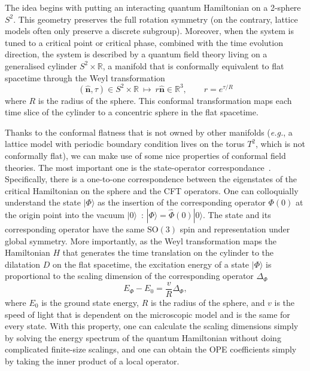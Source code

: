 \documentclass{timesjhep}
\begin{document}
The idea begins with putting an interacting quantum Hamiltonian on a 2-sphere $S^2$. This geometry preserves the full rotation symmetry (on the contrary, lattice models often only preserve a discrete subgroup). Moreover, when the system is tuned to a critical point or critical phase, combined with the time evolution direction, the system is described by a quantum field theory living on a generalised cylinder $S^2\times\mathbb{R}$, a manifold that is conformally equivalent to flat spacetime through the Weyl transformation
\begin{equation}
    (\hat{\mathbf{n}},\tau)\in S^2\times\mathbb{R}\ \longmapsto\ r\hat{\mathbf{n}}\in\mathbb{R}^3,\qquad r=e^{\tau/R}
\end{equation}
where $R$ is the radius of the sphere. This conformal transformation maps each time slice of the cylinder to a concentric sphere in the flat spacetime.

Thanks to the conformal flatness that is not owned by other manifolds (\textit{e.g.}, a lattice model with periodic boundary condition lives on the torus $T^2$, which is not conformally flat), we can make use of some nice properties of conformal field theories. The most important one is the state-operator correspondance~\cite{Pappadopulo2012Radial,Rychkov2016CFT,SimmonsDuffin2016CFT}. Specifically, there is a one-to-one correspondence between the eigenstates of the critical Hamiltonian on the sphere and the CFT operators. One can colloquially understand the state $|\Phi\rangle$ as the insertion of the corresponding operator $\Phi(0)$ at the origin point into the vacuum $|0\rangle$~: $|\Phi\rangle=\hat{\Phi}(0)|0\rangle$. The state and its corresponding operator have the same $\mathrm{SO}(3)$ spin and representation under global symmetry. More importantly, as the Weyl transformation maps the Hamiltonian $H$ that generates the time translation on the cylinder to the dilatation $D$ on the flat spacetime, the excitation energy of a state $|\Phi\rangle$ is proportional to the scaling dimension of the corresponding operator $\Delta_\Phi$
\begin{equation}
    E_\Phi-E_0=\frac{v}{R}\Delta_\Phi,
\end{equation}
where $E_0$ is the ground state energy, $R$ is the radius of the sphere, and $v$ is the speed of light that is dependent on the microscopic model and is the same for every state. With this property, one can calculate the scaling dimensions simply by solving the energy spectrum of the quantum Hamiltonian without doing complicated finite-size scalings, and one can obtain the OPE coefficients simply by taking the inner product of a local operator.
\end{document}
